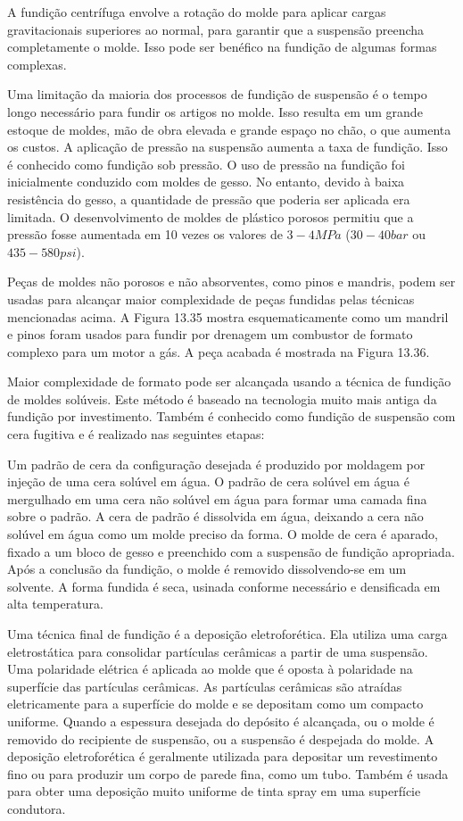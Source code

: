 A fundição centrífuga envolve a rotação do molde para aplicar cargas gravitacionais superiores ao normal, para garantir que a suspensão preencha completamente o molde. Isso pode ser benéfico na fundição de algumas formas complexas.

Uma limitação da maioria dos processos de fundição de suspensão é o tempo longo necessário para fundir os artigos no molde. Isso resulta em um grande estoque de moldes, mão de obra elevada e grande espaço no chão, o que aumenta os custos. A aplicação de pressão na suspensão aumenta a taxa de fundição. Isso é conhecido como fundição sob pressão. O uso de pressão na fundição foi inicialmente conduzido com moldes de gesso. No entanto, devido à baixa resistência do gesso, a quantidade de pressão que poderia ser aplicada era limitada. O desenvolvimento de moldes de plástico porosos permitiu que a pressão fosse aumentada em 10 vezes os valores de $3-4 MPa$ ($30-40 bar$ ou $435-580 psi$).

Peças de moldes não porosos e não absorventes, como pinos e mandris, podem ser usadas para alcançar maior complexidade de peças fundidas pelas técnicas mencionadas acima. A Figura 13.35 mostra esquematicamente como um mandril e pinos foram usados para fundir por drenagem um combustor de formato complexo para um motor a gás. A peça acabada é mostrada na Figura 13.36.

Maior complexidade de formato pode ser alcançada usando a técnica de fundição de moldes solúveis. Este método é baseado na tecnologia muito mais antiga da fundição por investimento. Também é conhecido como fundição de suspensão com cera fugitiva e é realizado nas seguintes etapas:

Um padrão de cera da configuração desejada é produzido por moldagem por injeção de uma cera solúvel em água.
O padrão de cera solúvel em água é mergulhado em uma cera não solúvel em água para formar uma camada fina sobre o padrão.
A cera de padrão é dissolvida em água, deixando a cera não solúvel em água como um molde preciso da forma.
O molde de cera é aparado, fixado a um bloco de gesso e preenchido com a suspensão de fundição apropriada.
Após a conclusão da fundição, o molde é removido dissolvendo-se em um solvente.
A forma fundida é seca, usinada conforme necessário e densificada em alta temperatura.

Uma técnica final de fundição é a deposição eletroforética. Ela utiliza uma carga eletrostática para consolidar partículas cerâmicas a partir de uma suspensão. Uma polaridade elétrica é aplicada ao molde que é oposta à polaridade na superfície das partículas cerâmicas. As partículas cerâmicas são atraídas eletricamente para a superfície do molde e se depositam como um compacto uniforme. Quando a espessura desejada do depósito é alcançada, ou o molde é removido do recipiente de suspensão, ou a suspensão é despejada do molde. A deposição eletroforética é geralmente utilizada para depositar um revestimento fino ou para produzir um corpo de parede fina, como um tubo. Também é usada para obter uma deposição muito uniforme de tinta spray em uma superfície condutora.

